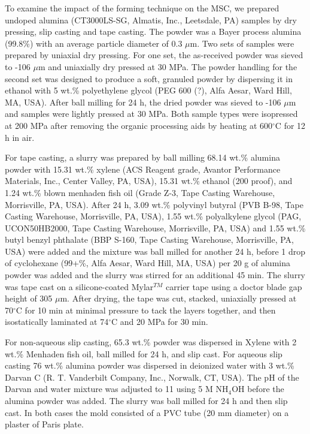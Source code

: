 To examine the impact of the forming technique on the MSC, we prepared undoped alumina (CT3000LS-SG, Almatis, Inc., Leetsdale, PA) samples by dry pressing, slip casting and tape casting. The powder was a Bayer process alumina (99.8\%) with an average particle diameter of 0.3 $\mu$m. Two sets of samples were prepared by uniaxial dry pressing. For one set, the as-received powder was sieved to -106 $\mu$m and uniaxially dry pressed at 30 MPa. The powder handling for the second set was designed to produce a soft, granuled powder by dispersing it in ethanol with 5 wt.\% polyethylene glycol (PEG 600 (?), Alfa Aesar, Ward Hill, MA, USA). After ball milling for 24 h, the dried powder was sieved to -106 $\mu$m and samples were lightly pressed at 30 MPa.  Both sample types were isopressed at 200 MPa after removing the organic processing aids by heating at 600$^{\circ}$C for 12 h in air.

For tape casting, a slurry was prepared by ball milling 68.14 wt.\% alumina powder with 15.31 wt.\% xylene (ACS Reagent grade, Avantor Performance Materials, Inc., Center Valley, PA, USA), 15.31 wt.\% ethanol (200 proof), and 1.24 wt.\% blown menhaden fish oil (Grade Z-3, Tape Casting Warehouse, Morrisville, PA, USA). After 24 h, 3.09 wt.\% polyvinyl butyral (PVB B-98, Tape Casting Warehouse, Morrisville, PA, USA), 1.55 wt.\% polyalkylene glycol (PAG, UCON50HB2000, Tape Casting Warehouse, Morrisville, PA, USA) and 1.55 wt.\% butyl benzyl phthalate (BBP S-160, Tape Casting Warehouse, Morrisville, PA, USA) were added and the mixture was ball milled for another 24 h, before 1 drop of cyclohexane (99+\%, Alfa Aesar, Ward Hill, MA, USA) per 20 g of alumina powder was added and the slurry was stirred for an additional 45 min. The slurry was tape cast on a silicone-coated Mylar$^{TM}$ carrier tape using a doctor blade gap height of 305 $\mu$m. After drying, the tape was cut, stacked, uniaxially pressed at 70$^{\circ}$C for 10 min at minimal pressure to tack the layers together, and then isostatically laminated at 74$^{\circ}$C and 20 MPa for 30 min.

For non-aqueous slip casting, 65.3 wt.\% powder was dispersed in Xylene with 2 wt.\% Menhaden fish oil, ball milled for 24 h, and slip cast. For aqueous slip casting 76 wt.\% alumina powder was dispersed in deionized water with 3 wt.\% Darvan C (R. T. Vanderbilt Company, Inc., Norwalk, CT, USA). The pH of the Darvan and water mixture was adjusted to 11 using 5 M NH$_{4}$OH before the alumina powder was added. The slurry was ball milled for 24 h and then slip cast. In both cases the mold consisted of a PVC tube (20 mm diameter) on a plaster of Paris plate.

